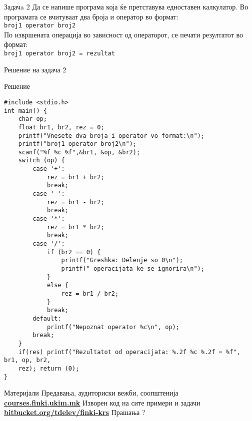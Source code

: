 \begin{frame}{Задачa 2}
Да се напише програма која ќе претставува едноставен калкулатор. Во програмата
се вчитуваат два броја и оператор во формат:\\
\texttt{broj1 operator broj2}\\
По извршената операција во зависност од операторот, се печати резултатот во
формат:\\
\texttt{broj1 operator broj2 = rezultat}
\end{frame}

\begin{frame}[fragile,shrink=10]{Решение на задача 2}
\begin{exampleblock}{Решение}
\begin{lstlisting}
#include <stdio.h>
int main() {
    char op;
    float br1, br2, rez = 0;
    printf("Vnesete dva broja i operator vo format:\n");
    printf("broj1 operator broj2\n");
    scanf("%f %c %f",&br1, &op, &br2);
    switch (op) {
        case '+':
            rez = br1 + br2;
            break;
        case '-':
            rez = br1 - br2;
            break;
        case '*':
            rez = br1 * br2;
            break;
        case '/':
            if (br2 == 0) {
                printf("Greshka: Delenje so 0\n");
                printf(" operacijata ke se ignorira\n");
            }
            else {
                rez = br1 / br2;
            }
            break;
        default:
            printf("Nepoznat operator %c\n", op);
        break;
    }
    if(res) printf("Rezultatot od operacijata: %.2f %c %.2f = %f", br1, op, br2,
    rez); return (0);
}
\end{lstlisting}
\end{exampleblock}
\end{frame}

\begin{frame}{Материјали}{}
	Предавања, аудиториски вежби, соопштенија\\
	\href{http://courses.finki.ukim.mk/}{\textbf{courses.finki.ukim.mk}}
	\vfill
	Изворен код на сите примери и задачи\\
	\href{http://bitbucket.org/tdelev/finki-krs/}{\textbf{bitbucket.org/tdelev/finki-krs}}
	\vfill
	{\Huge Прашања ?}
\end{frame}


